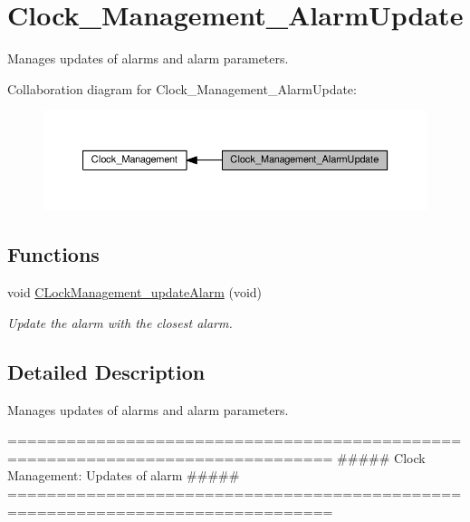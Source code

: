 \hypertarget{group___clock___management___alarm_update}{}\section{Clock\+\_\+\+Management\+\_\+\+Alarm\+Update}
\label{group___clock___management___alarm_update}


Manages updates of alarms and alarm parameters.  


Collaboration diagram for Clock\+\_\+\+Management\+\_\+\+Alarm\+Update\+:\nopagebreak
\begin{figure}[H]
\begin{center}
\leavevmode
\includegraphics[width=350pt]{dc/d65/group___clock___management___alarm_update}
\end{center}
\end{figure}
\subsection*{Functions}
\begin{DoxyCompactItemize}
\item 
void \hyperlink{group___clock___management___alarm_update_gab3193e7c0f26b76a48829295caf4888f}{C\+Lock\+Management\+\_\+update\+Alarm} (void)
\begin{DoxyCompactList}\small\item\em Update the alarm with the closest alarm. \end{DoxyCompactList}\end{DoxyCompactItemize}


\subsection{Detailed Description}
Manages updates of alarms and alarm parameters. 

\begin{DoxyVerb}===============================================================================
            ##### Clock Management: Updates of alarm  #####
===============================================================================
\end{DoxyVerb}
 

